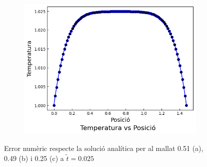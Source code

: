 \documentclass{article}
\begin{document}
\begin{figure}[h]
\begin{subfigure}[b]{0.32\textwidth}
        \includegraphics[width=\textwidth]{images/T_vs_z_at3.png}
        \caption{} 
        \label{fig:err_euler_exp_at2}
    \end{subfigure}
    \caption{Error numèric respecte la solució analítica per al mallat 0.51 (a), 0.49 (b) i 0.25 (c) a $\tilde{t}=0.025$}
    \label{fig:err_euler_explicit}
\end{figure}
\end{document}
